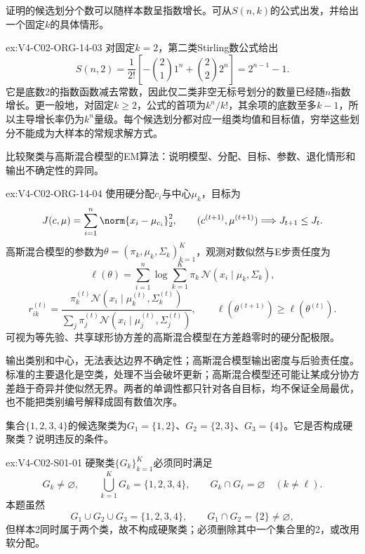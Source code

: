 \begin{SLChapterExercisePairSection}
\begin{exercise}\label{ex:V4-C02-ORG-14-03}
证明\kMeans{}的候选划分个数可以随样本数呈指数增长。可从$S(n,k)$的公式出发，并给出一个固定$k$的具体情形。
\end{exercise}
\ifSLFullEdition
{}\label{sol:V4-C02-ORG-14-03}
\begin{chapterexercisesolution}{ex:V4-C02-ORG-14-03}
对固定$k=2$，第二类Stirling数公式给出
\[
S(n,2)=\frac1{2!}\left[-\binom21 1^n+\binom22 2^n\right]
=2^{n-1}-1.
\]
它是底数2的指数函数减去常数，因此仅二类非空无标号划分的数量已经随$n$指数增长。更一般地，对固定$k\geq2$，公式的首项为$k^n/k!$，其余项的底数至多$k-1$，所以主导增长率仍为$k^n$量级。每个候选划分都对应一组类均值和目标值，穷举这些划分不能成为大样本\kMeans{}的常规求解方式。
\end{chapterexercisesolution}
\fi

\begin{exercise}\label{ex:V4-C02-ORG-14-04}
比较\kMeans{}聚类与高斯混合模型的EM算法：说明模型、分配、目标、参数、退化情形和输出不确定性的异同。
\end{exercise}
\ifSLFullEdition
{}\label{sol:V4-C02-ORG-14-04}
\begin{chapterexercisesolution}{ex:V4-C02-ORG-14-04}
\kMeans{}使用硬分配$c_i$与中心$\mu_k$，目标为
\[
J(c,\mu)=\sum_{i=1}^{n}\norm{x_i-\mu_{c_i}}_2^2,
\qquad
(c^{(t+1)},\mu^{(t+1)})\Longrightarrow J_{t+1}\le J_t.
\]
高斯混合模型的参数为$\theta=(\pi_k,\mu_k,\Sigma_k)_{k=1}^{K}$，观测对数似然与E步责任度为
\[
\ell(\theta)=\sum_{i=1}^{n}\log\sum_{k=1}^{K}
\pi_k\,\mathcal N(x_i\mid\mu_k,\Sigma_k),
\]
\[
r_{ik}^{(t)}
=\frac{\pi_k^{(t)}\mathcal N(x_i\mid\mu_k^{(t)},\Sigma_k^{(t)})}
{\sum_j\pi_j^{(t)}\mathcal N(x_i\mid\mu_j^{(t)},\Sigma_j^{(t)})},
\qquad
\ell(\theta^{(t+1)})\ge\ell(\theta^{(t)}).
\]
\kMeans{}可视为等先验、共享球形协方差的高斯混合模型在方差趋零时的硬分配极限。

\kMeans{}输出类别和中心，无法表达边界不确定性；高斯混合模型输出密度与后验责任度。标准\kMeans{}的主要退化是空类，处理不当会破坏更新；高斯混合模型还可能让某成分协方差趋于奇异并使似然无界。两者的单调性都只针对各自目标，均不保证全局最优，也不能把类别编号解释成固有数值次序。
\end{chapterexercisesolution}
\fi

\begin{exercise}\label{ex:V4-C02-S01-01}
集合$\{1,2,3,4\}$的候选聚类为$G_1=\{1,2\}$、$G_2=\{2,3\}$、$G_3=\{4\}$。它是否构成硬聚类？说明违反的条件。
\end{exercise}
\ifSLFullEdition
{}\label{sol:V4-C02-S01-01}
\begin{chapterexercisesolution}{ex:V4-C02-S01-01}
硬聚类$\{G_k\}_{k=1}^{K}$必须同时满足
\[
G_k\ne\varnothing,
\qquad
\bigcup_{k=1}^{K}G_k=\{1,2,3,4\},
\qquad
G_k\cap G_\ell=\varnothing\quad(k\ne\ell).
\]
本题虽然
\[
G_1\cup G_2\cup G_3=\{1,2,3,4\},
\qquad
G_1\cap G_2=\{2\}\ne\varnothing,
\]
但样本2同时属于两个类，故不构成硬聚类；必须删除其中一个集合里的2，或改用软分配。
\end{chapterexercisesolution}
\fi


\end{SLChapterExercisePairSection}

